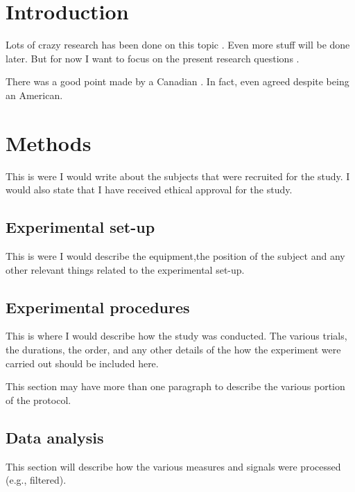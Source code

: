 \documentclass[letterpaper,12pt]{article}
\begin{document}
\newpage
\section*{Introduction}

Lots of crazy research has been done on this topic \citep{Heroux:2015}. 
Even more stuff will be done later. 
But for now I want to focus on the present research questions \citep{Butler2003}.

There was a good point made by a Canadian \citep{Brownstone2006}. 
In fact, \cite{Sawczuk1995} even agreed despite being an American.

\lipsum[1]


\section*{Methods}

This is were I would write about the subjects that were recruited for the study. 
I would also state that I have received ethical approval for the study.

\subsection*{Experimental set-up}

This is were I would describe the equipment,the position of the subject and any other relevant things related to the experimental set-up.

\subsection*{Experimental procedures}

This is where I would describe how the study was conducted. 
The various trials, the durations, the order, and any other details of the how the experiment were carried out should be included here.

This section may have more than one paragraph to describe the various portion of the protocol.

\subsection*{Data analysis}

This section will describe how the various measures and signals were processed (e.g., filtered). 
\end{document}
